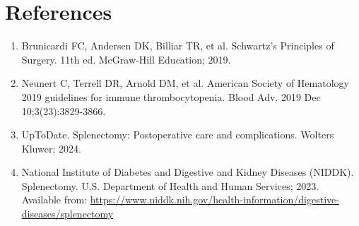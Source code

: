 \section*{References}
\begin{enumerate}
  \item Brunicardi FC, Andersen DK, Billiar TR, et al. Schwartz's Principles of Surgery. 11th ed. McGraw-Hill Education; 2019.
  \item Neunert C, Terrell DR, Arnold DM, et al. American Society of Hematology 2019 guidelines for immune thrombocytopenia. Blood Adv. 2019 Dec 10;3(23):3829-3866.
  \item UpToDate. Splenectomy: Postoperative care and complications. Wolters Kluwer; 2024.
  \item National Institute of Diabetes and Digestive and Kidney Diseases (NIDDK). Splenectomy. U.S. Department of Health and Human Services; 2023. Available from: \url{https://www.niddk.nih.gov/health-information/digestive-diseases/splenectomy}
\end{enumerate}

\clearpage
